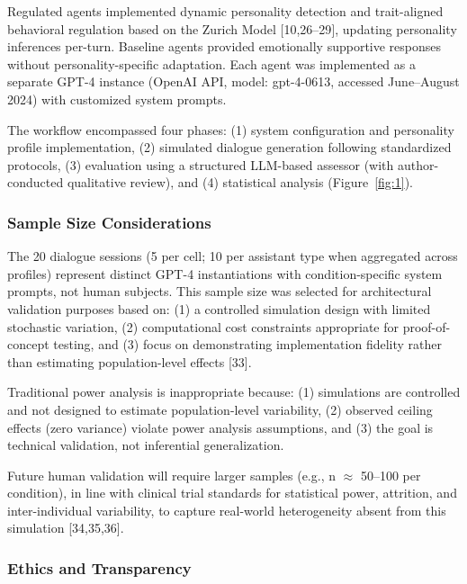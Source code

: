Regulated agents implemented dynamic personality detection and trait-aligned behavioral regulation based on the Zurich Model {[}10,26--29{]}, updating personality inferences per-turn. Baseline agents provided emotionally supportive responses without personality-specific adaptation. Each agent was implemented as a separate GPT-4 instance (OpenAI API, model: gpt-4-0613, accessed June--August 2024) with customized system prompts.

The workflow encompassed four phases: (1) system configuration and personality profile implementation, (2) simulated dialogue generation following standardized protocols, (3) evaluation using a structured LLM-based assessor (with author-conducted qualitative review), and (4) statistical analysis (Figure~\ref{fig:1}).




\subsubsection{Sample Size Considerations}\label{sample-size-considerations}

The 20 dialogue sessions (5 per cell; 10 per assistant type when aggregated across profiles) represent distinct GPT-4 instantiations with condition-specific system prompts, not human subjects. This sample size was selected for architectural validation purposes based on: (1) a controlled simulation design with limited stochastic variation, (2) computational cost constraints appropriate for proof-of-concept testing, and (3) focus on demonstrating implementation fidelity rather than estimating population-level effects {[}33{]}.

Traditional power analysis is inappropriate because: (1) simulations are controlled and not designed to estimate population-level variability, (2) observed ceiling effects (zero variance) violate power analysis assumptions, and (3) the goal is technical validation, not inferential generalization.

Future human validation will require larger samples (e.g., n $\approx$ 50--100 per condition), in line with clinical trial standards for statistical power, attrition, and inter-individual variability, to capture real-world heterogeneity absent from this simulation {[}34,35,36{]}.

\subsubsection{Ethics and Transparency}\label{ethics-and-transparency}

